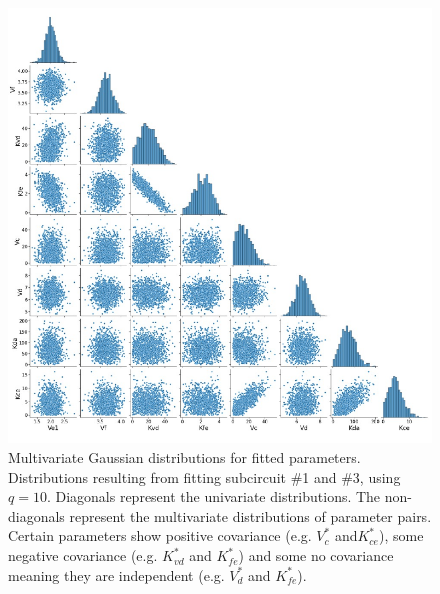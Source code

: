 \begin{figure}[H] %
    \centering
    \begin{adjustbox}{center}
        \includegraphics[width=1\textwidth]{chapters/Chapter 2/multivariate_from_fit} %
    \end{adjustbox}
    \caption{Multivariate Gaussian distributions for fitted parameters. Distributions resulting from fitting subcircuit \#1 and \#3, using $q=10$. Diagonals represent the univariate distributions. The non-diagonals represent the multivariate distributions of parameter pairs. Certain parameters show positive covariance (e.g. $V^*_c$ and$ K^*_{ce}$), some negative covariance (e.g. $K^*_{vd}$ and $K^*_{fe}$) and some no covariance meaning they are independent (e.g. $V^*_{d}$ and $K^*_{fe}$). }
    \label{fig:multivariate_from_fit} %
\end{figure}

